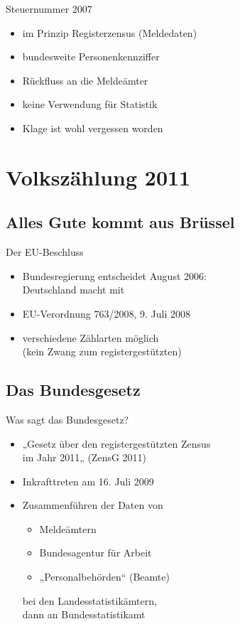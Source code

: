 \documentclass[ignorenonframetext,ucs]{beamer}
\begin{document}
\begin{frame}{Steuernummer 2007}\begin{itemize}
\item im Prinzip Registerzensus (Meldedaten)
\item bundesweite Personenkennziffer
\item Rückfluss an die Meldeämter
\item keine Verwendung für Statistik
\item Klage ist wohl vergessen worden
\end{itemize}\end{frame}

\section{Volkszählung 2011}

\subsection{Alles Gute kommt aus Brüssel}

\begin{frame}{Der EU-Beschluss}\begin{itemize}
\item Bundesregierung entscheidet August 2006:\\Deutschland macht mit
\item EU-Verordnung 763/2008, 9. Juli 2008
\item verschiedene Zählarten möglich\\(kein Zwang zum registergestützten)
\end{itemize}\end{frame}

\subsection{Das Bundesgesetz}

\begin{frame}{Was sagt das Bundesgesetz?}\begin{itemize}
\item „Gesetz über den registergestützten Zensus\\im Jahr 2011„ (ZensG 2011)
\item Inkrafttreten am 16. Juli 2009
\item Zusammenführen der Daten von\begin{itemize}
	\item Meldeämtern
	\item Bundesagentur für Arbeit
	\item „Personalbehörden“ (Beamte)
\end{itemize} bei den Landesstatistikämtern,\\dann an Bundesstatistikamt
\end{itemize}\end{frame}
\end{document}
